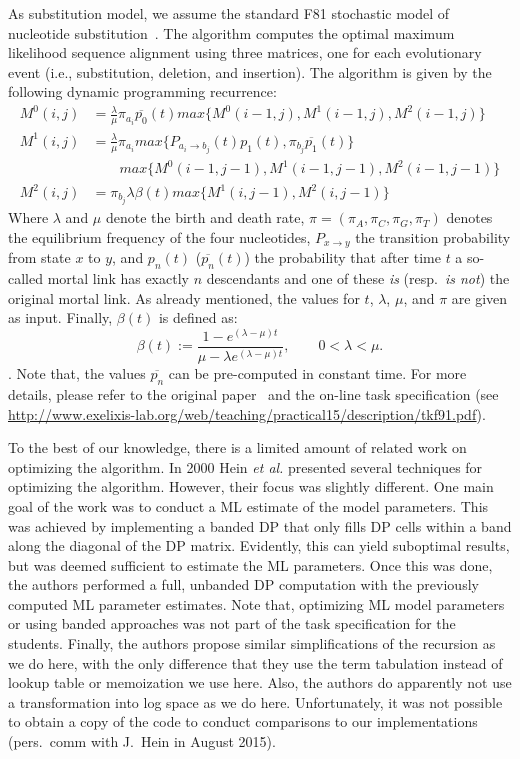 \documentclass[runningheads,a4paper]{llncs}
\begin{document}
As substitution model, we assume the standard F81 stochastic model of nucleotide substitution~\cite{felsenstein1981evolutionary}.
The algorithm computes the optimal maximum likelihood sequence alignment using three matrices, one for each evolutionary event (i.e., substitution, deletion, and insertion).
The algorithm is given by the following dynamic programming recurrence:
\[
\begin{aligned}
  M^0(i,j)&=\frac{\lambda}{\mu}\pi_{a_i}\overline{p_0}(t)max\{M^0(i-1, j), M^1(i-1,j), M^2(i-1,j)\}\\
  M^1(i,j)&=\frac{\lambda}{\mu}\pi_{a_i}max\{P_{a_i \rightarrow b_j}(t) p_1(t), \pi_{b_j}\overline{p_1}(t)\}\\
          &\quad\quad max\{M^0(i-1, j-1), M^1(i-1,j-1), M^2(i-1,j-1)\}\\
  M^2(i,j)&=\pi_{b_j}\lambda\beta(t)max\{M^1(i,j-1), M^2(i,j-1)\}
\end{aligned}
\]
Where $\lambda$ and $\mu$ denote the birth and death rate, $\pi=(\pi_A,\pi_C,\pi_G,\pi_T)$ denotes the equilibrium frequency of the four nucleotides,
$P_{x \rightarrow y}$ the transition probability from state $x$ to $y$, and $p_n(t)$ ($\overline{p_n}(t)$) the probability that after time 
$t$ a so-called mortal link has exactly $n$ descendants and one of these {\em is} (resp.~{\em is not}) the original mortal link.
As already mentioned, the values for $t$, $\lambda$, $\mu$, and $\pi$ are given as input.
Finally, $\beta(t)$ is defined as:
$$\beta(t) := \frac{1 - e^{(\lambda-\mu)t}}{\mu - \lambda e^{(\lambda - \mu)t}}, \qquad 0 < \lambda < \mu.$$.
Note that, the values $\overline{p_n}$ can be pre-computed in constant time. For more details, please refer to the original paper~\cite{felsenstein1981evolutionary} and the on-line
task specification (see {\footnotesize \url{http://www.exelixis-lab.org/web/teaching/practical15/description/tkf91.pdf}}).

To the best of our knowledge, there is a limited amount of related work on optimizing the algorithm.
In 2000 Hein {\em et al.}\cite{hein2000statistical} presented several techniques for optimizing the algorithm. However, their focus was slightly different. One main
goal of the work was to conduct a ML estimate of the model parameters. This was achieved by implementing a banded DP that only fills DP cells
within a band along the diagonal of the DP matrix. Evidently, this can yield suboptimal results, but was deemed sufficient to estimate the ML parameters.
Once this was done, the authors performed a full, unbanded DP computation with the previously computed ML parameter estimates.
Note that, optimizing ML model parameters or using banded approaches was not part of the task specification for the students.
Finally, the authors propose similar simplifications of the recursion as we do here, with the only difference that they use
the term tabulation instead of lookup table or memoization we use here.
Also, the authors do apparently not use a transformation into log space as we do here. Unfortunately, it was not possible to obtain
a copy of the code to conduct comparisons to our implementations (pers.~comm with J.~Hein in August 2015).
\end{document}

